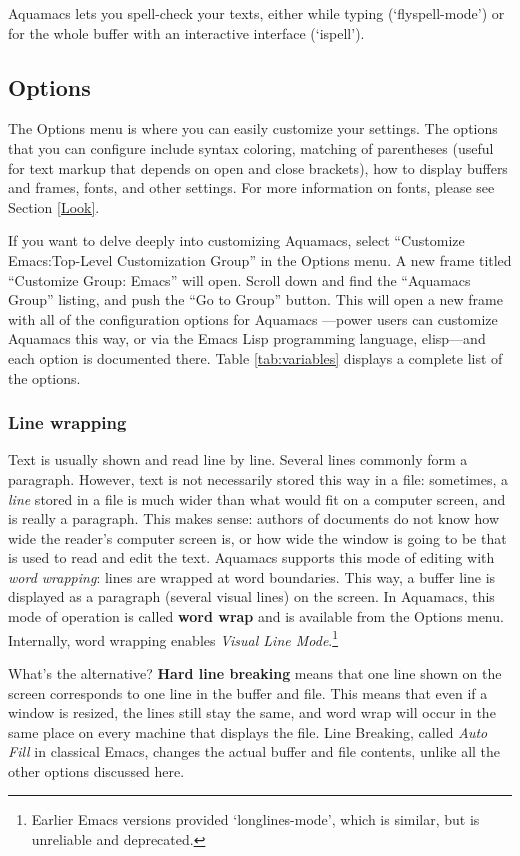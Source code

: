 \documentclass[11pt,letterpaper]{article}
\begin{document}
Aquamacs lets you spell-check your texts, either while typing (`flyspell-mode') or for the whole buffer with an interactive interface (`ispell').


\subsection{Options}
The Options menu is where you can easily customize your
settings. The options that you can configure include syntax coloring,
matching of parentheses (useful for text markup that depends on open
and close brackets), how to display buffers and frames, fonts, and other
settings. For more information on fonts, please see Section \ref{Look}.

If you want to delve deeply into customizing Aquamacs, select
``Customize Emacs:Top-Level Customization Group'' in the Options
menu. A new frame titled ``Customize Group: Emacs'' will open. Scroll
down and find the ``Aquamacs Group'' listing, and push the ``Go to
Group'' button. This will open a new frame with all of the
configuration options for Aquamacs ---power users can customize Aquamacs this way, or via the Emacs Lisp programming language, elisp---and each option is documented there. 
Table \ref{tab:variables} displays a complete list of the options. 

\subsubsection{Line wrapping}

Text is usually shown and read line by line.  Several lines commonly form a paragraph.   However, text is not necessarily stored this way in a file:  sometimes, a \emph{line} stored in a file is much wider than what would fit on a computer screen, and is really a paragraph.  This makes sense: authors of documents do not know how wide the reader's computer screen is, or how wide the window is going to be that is used to read and edit the text.  Aquamacs supports this mode of editing with \emph{word wrapping}: lines are wrapped at word boundaries.  This way, a buffer line is displayed as a paragraph (several visual lines) on the screen.  In Aquamacs, this mode of operation is called \textbf{ word wrap} and is available from the Options menu.  Internally, word wrapping enables \emph{Visual Line Mode}.\footnote{Earlier Emacs versions provided `longlines-mode', which is similar, but is unreliable and deprecated.}

What's the alternative?  \textbf{Hard line breaking} means that one line shown on the screen corresponds to one line in the buffer and file.  This means that even if a window is resized, the lines still stay the same, and word wrap will occur in the same place on every machine that displays the file.   Line Breaking, called \emph{Auto Fill} in classical Emacs, changes the actual buffer and file contents, unlike all the other options discussed here.
\end{document}

